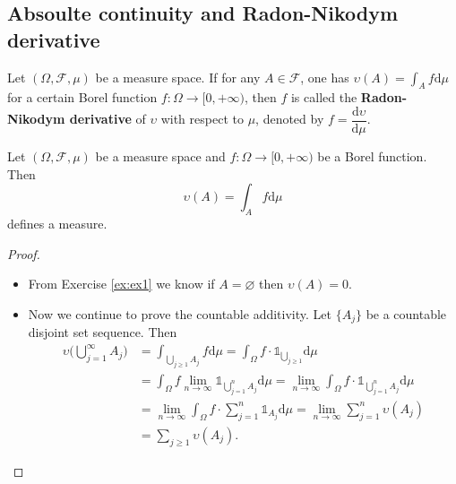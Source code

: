 \documentclass[11pt,singlecolumn, openany, citestyle=authoryear]{elegantbook}
\begin{document}
\begin{CJK}{UTF8}{gbsn}
\section{Absoulte continuity and Radon-Nikodym derivative}
\begin{definition}
    Let $(\Omega,\mathcal{F},\mu)$ be a measure space.
    If for any $A\in\mathcal{F}$, one has $\displaystyle \upsilon(A)=\int_A f\mathrm{d}\mu$ for a certain
    Borel function $f:\Omega\to[0,+\infty)$,
    then $f$ is called the \textbf{Radon-Nikodym derivative} of $\upsilon$ with respect to 
    $\mu$, denoted by $f = \dfrac{\mathrm{d}\upsilon}{\mathrm{d}\mu}$.
\end{definition}
\begin{proposition}
    Let $(\Omega,\mathcal{F},\mu)$ be a measure space and $f:\Omega\to[0,+\infty)$
    be a Borel function. Then 
    $$
    \upsilon(A)=\int_A f\mathrm{d}\mu
    $$
    defines a measure.
\end{proposition}
\begin{proof}
    \begin{itemize}
        \item From Exercise \ref{ex:ex1} we know if $A = \varnothing$ then $\upsilon(A)=0$.
        \item Now we continue to prove the countable additivity. Let $\{A_j\}$ be a countable
        disjoint set sequence. Then 
        \begin{align*}
            \upsilon\biggl(\bigcup_{j=1}^\infty A_j\biggr)&=
            \int_{\bigcup_{j\geqslant 1}A_j}f\mathrm{d}\mu=
            \int_\Omega f\cdot \mathds{1}_{\bigcup_{j\geqslant 1}}\mathrm{d}\mu\\
            &=\int_\Omega f\lim_{n\to\infty} \mathds{1}_{\bigcup_{j=1}^n A_j}\mathrm{d}\mu 
            =\lim_{n\to\infty}\int_\Omega f\cdot \mathds{1}_{\bigcup_{j=1}^nA_j} \mathrm{d}\mu\\
            &= \lim_{n\to\infty}\int_\Omega f\cdot {\sum_{j=1}^n\mathds{1}_{A_j}} \mathrm{d}\mu
            =\lim_{n\to\infty}\sum_{j=1}^n\upsilon(A_j)\\
            &=\sum_{j\geqslant 1}\upsilon(A_j).
        \end{align*}
    \end{itemize}
\end{proof}


\end{CJK}
\end{document}
